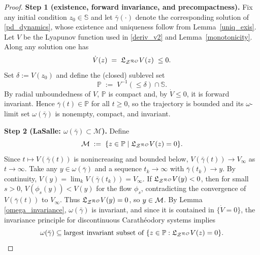 \documentclass[journal,twoside,web]{ieeecolor}
\newcommand{\rev}[1]{\textcolor{revisionblue}{#1}}
\begin{document}
\iffalse
\begin{proof}
\rev{\textbf{Step 1 (existence, forward invariance, and precompactness).}
Fix any initial condition $z_0\in\mathbb S$ and let $\bar\gamma(\cdot)$ denote the corresponding solution of \eqref{pd_dynamics}, whose existence and uniqueness follow from Lemma~\ref{uniq_exis}.
Let $V$ be the Lyapunov function used in \eqref{deriv_v2} and Lemma~\ref{monotonicity}. Along any solution one has
\[
\dot V(z)\;=\;\mathfrak{L}_{{\cal Z}^{\cal RO}}V(z)\;\le 0.
\]
Set $\delta:=V(z_0)$ and define the (closed) sublevel set
\[
\mathbb P\;:=\;V^{-1}(\le \delta)\cap \mathbb S.
\]
By radial unboundedness of $V$, $\mathbb P$ is compact and, by $\dot V\le 0$, it is forward invariant. Hence $\bar\gamma(t)\in\mathbb P$ for all $t\ge 0$, so the trajectory is bounded and its $\omega$-limit set $\omega(\bar\gamma)$ is nonempty, compact, and invariant.}

\medskip
\rev{\textbf{Step 2 (LaSalle: $\omega(\bar\gamma)\subset \mathcal M$).}
Define
\[
{\cal M}\;:=\;\{z\in \mathbb P\mid \mathfrak{L}_{{\cal Z}^{\cal RO}}V(z)=0\}.
\]
Since $t\mapsto V(\bar\gamma(t))$ is nonincreasing and bounded below, $V(\bar\gamma(t))\to V_\infty$ as $t\to\infty$.
Take any $y\in \omega(\bar\gamma)$ and a sequence $t_k\to\infty$ with $\bar\gamma(t_k)\to y$. By continuity, $V(y)=\lim_k V(\bar\gamma(t_k))=V_\infty$.
If $\mathfrak{L}_{{\cal Z}^{\cal RO}}V(y)<0$, then for small $s>0$, $V(\phi_s(y))<V(y)$ for the flow $\phi_s$, contradicting the convergence of $V(\bar\gamma(t))$ to $V_\infty$.
Thus $\mathfrak{L}_{{\cal Z}^{\cal RO}}V(y)=0$, so $y\in{\cal M}$. By Lemma \ref{omega_invariance}, $\omega(\bar\gamma)$ is invariant, and since it is contained in $\{\dot V=0\}$, the invariance principle for discontinuous Carathéodory systems \cite[Prop.~2.1]{cherukuri2016} implies
\[
\omega(\bar\gamma)\subseteq \text{largest invariant subset of }\{z\in\mathbb P:\mathfrak{L}_{{\cal Z}^{\cal RO}}V(z)=0\}.
\]}


\end{proof}
\end{document}

